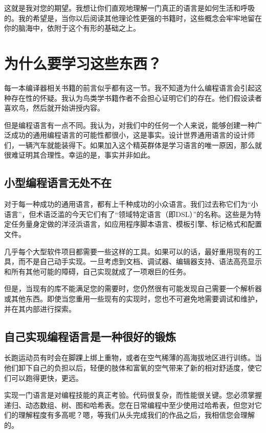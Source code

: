 \documentclass[cn,11pt,chinese]{elegantbook}
\begin{document}
这就是我对您的期望。我想让你们直观地理解一门真正的语言是如何生活和呼吸的。我的希望是，当你以后阅读其他理论性更强的书籍时，这些概念会牢牢地留在你的脑海中，依附于这个有形的基础之上。

\section{为什么要学习这些东西？}

每一本编译器相关书籍的前言似乎都有这一节。我不知道为什么编程语言会引起这种存在性的怀疑。我认为鸟类学书籍作者不会担心证明它们的存在。他们假设读者喜欢鸟，然后就开始讲授内容。

但是编程语言有一点不同。我认为，对我们中的任何一个人来说，能够创建一种广泛成功的通用编程语言的可能性都很小，这是事实。设计世界通用语言的设计师们，一辆汽车就能装得下。如果加入这个精英群体是学习语言的唯一原因，那么就很难证明其合理性。幸运的是，事实并非如此。

\subsection{小型编程语言无处不在}

对于每一种成功的通用语言，都有上千种成功的小众语言。我们过去称它们为“小语言”，但术语泛滥的今天它们有了“领域特定语言（即DSL）”的名称。这些是为特定任务量身定做的洋泾浜语言，如应用程序脚本语言、模板引擎、标记格式和配置文件。

几乎每个大型软件项目都需要一些这样的工具。如果可以的话，最好重用现有的工具，而不是自己动手实现。一旦考虑到文档、调试器、编辑器支持、语法高亮显示和所有其他可能的障碍，自己实现就成了一项艰巨的任务。

但是，当现有的库不能满足您的需要时，您仍然很有可能发现自己需要一个解析器或其他东西。即使当您重用一些现有的实现时，您也不可避免地需要调试和维护，并在其内部进行探索。

\subsection{自己实现编程语言是一种很好的锻炼}

长跑运动员有时会在脚踝上绑上重物，或者在空气稀薄的高海拔地区进行训练。当他们卸下自己的负担以后，轻便的肢体和富氧的空气带来了新的相对舒适度，使它们可以跑得更快，更远。

实现一门语言是对编程技能的真正考验。代码很复杂，而性能很关键。您必须掌握递归、动态数组、树、图和哈希表。您在日常编程中至少使用过哈希表，但您对它们的理解程度有多高呢？嗯，等我们从头完成我们的作品之后，我相信您会理解的。
\end{document}
